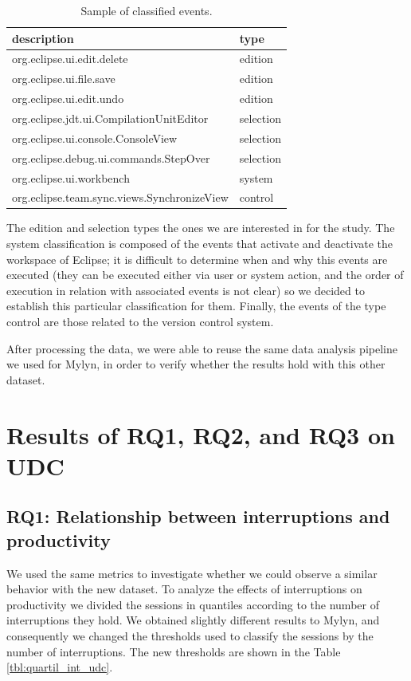 \documentclass[times]{smrauth}
\begin{document}
\begin{table}[ht!]
\tiny
\renewcommand{\arraystretch}{1.3}
\caption{Sample of classified events. }
\label{tbl:ej_events_udc}
\centering
\begin{tabular}{|p{5.5cm}| p{2 cm} |} 
  \hline 
description & type \\  
  \hline 
    \hline 
org.eclipse.ui.edit.delete & edition \\
org.eclipse.ui.file.save & edition \\
org.eclipse.ui.edit.undo & edition \\
org.eclipse.jdt.ui.CompilationUnitEditor & selection \\
org.eclipse.ui.console.ConsoleView & selection \\
org.eclipse.debug.ui.commands.StepOver & selection \\ 
org.eclipse.ui.workbench & system \\
org.eclipse.team.sync.views.SynchronizeView & control \\
\hline
\end{tabular}
\end{table}

The edition and selection types the ones we are interested in for the study. The system classification is composed of the events that activate and deactivate the workspace of Eclipse; it is difficult to determine when and why this events are executed (they can be executed either via user or system action, and the order of execution in relation with associated events is not clear) so we decided to establish this particular classification for them. Finally, the events of the type control are those related to the version control system. 

After processing the data, we were able to reuse the same data analysis pipeline we used for Mylyn, in order to verify whether the results hold with this other dataset.

\section{Results of RQ1, RQ2, and RQ3 on UDC}

\subsection{RQ1: Relationship between interruptions and productivity}
We used the same metrics to investigate whether we could observe a similar behavior with the new dataset. To analyze the effects of interruptions on productivity we divided the sessions in quantiles according to the number of interruptions they hold. We obtained slightly different results to Mylyn, and consequently we changed the thresholds used to classify the sessions by the number of interruptions. The new thresholds are shown in the Table \ref{tbl:quartil_int_udc}.
\end{document}
